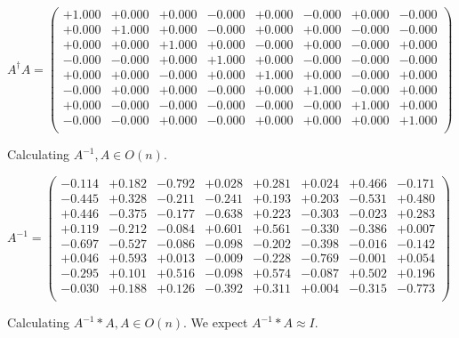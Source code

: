 \documentclass[9pt]{article}
\theoremstyle{plain}
\theoremstyle{definition}
\theoremstyle{remark}
\numberwithin{equation}{section}
\begin{document}
$A^{\dag} A = \left(
\begin{array}{
cccccccc}
+1.000 & +0.000 & +0.000 & -0.000 & +0.000 & -0.000 & +0.000 & -0.000 \\
+0.000 & +1.000 & +0.000 & -0.000 & +0.000 & +0.000 & -0.000 & -0.000 \\
+0.000 & +0.000 & +1.000 & +0.000 & -0.000 & +0.000 & -0.000 & +0.000 \\
-0.000 & -0.000 & +0.000 & +1.000 & +0.000 & -0.000 & -0.000 & -0.000 \\
+0.000 & +0.000 & -0.000 & +0.000 & +1.000 & +0.000 & -0.000 & +0.000 \\
-0.000 & +0.000 & +0.000 & -0.000 & +0.000 & +1.000 & -0.000 & +0.000 \\
+0.000 & -0.000 & -0.000 & -0.000 & -0.000 & -0.000 & +1.000 & +0.000 \\
-0.000 & -0.000 & +0.000 & -0.000 & +0.000 & +0.000 & +0.000 & +1.000 \\
\end{array}
\right)$ \newline 

Calculating $A^{-1} ,  A \in O(n)$.

$A^{-1} = \left(
\begin{array}{
cccccccc}
-0.114 & +0.182 & -0.792 & +0.028 & +0.281 & +0.024 & +0.466 & -0.171 \\
-0.445 & +0.328 & -0.211 & -0.241 & +0.193 & +0.203 & -0.531 & +0.480 \\
+0.446 & -0.375 & -0.177 & -0.638 & +0.223 & -0.303 & -0.023 & +0.283 \\
+0.119 & -0.212 & -0.084 & +0.601 & +0.561 & -0.330 & -0.386 & +0.007 \\
-0.697 & -0.527 & -0.086 & -0.098 & -0.202 & -0.398 & -0.016 & -0.142 \\
+0.046 & +0.593 & +0.013 & -0.009 & -0.228 & -0.769 & -0.001 & +0.054 \\
-0.295 & +0.101 & +0.516 & -0.098 & +0.574 & -0.087 & +0.502 & +0.196 \\
-0.030 & +0.188 & +0.126 & -0.392 & +0.311 & +0.004 & -0.315 & -0.773 \\
\end{array}
\right)$ \newline 

Calculating $A^{-1} *A  ,  A \in O(n)$.   We expect $A^{-1} *A  \approx I$. 
\end{document}
